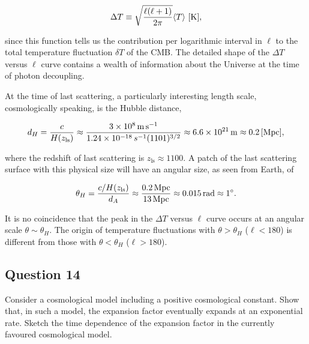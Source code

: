 \documentclass[a4paper,11pt]{article}
\begin{document}
\begin{align*}
    \Delta T \equiv \sqrt{\frac{\ell(\ell+1)}{2\pi}}\langle T \rangle ~ [{\rm K}],
\end{align*}

{\noindent}since this function tells us the contribution per logarithmic interval in $\ell$ to the total temperature fluctuation $\delta T$ of the CMB. The detailed shape of the $\Delta T$ versus $\ell$ curve contains a wealth of information about the Universe at the time of photon decoupling. 

{\noindent}At the time of last scattering, a particularly interesting length scale, cosmologically speaking, is the Hubble distance,

\begin{align*}
    d_H = \frac{c}{H(z_\mathrm{ls})} \approx \frac{3\times10^8\,{\rm m\,s^{-1}}}{1.24\times10^{-18}\,s^{-1}(1101)^{3/2}} \approx 6.6\times10^{21}\,{\rm m} \approx 0.2\,{[\rm Mpc]},
\end{align*}

{\noindent}where the redshift of last scattering is $z_\mathrm{ls}\approx1100$. A patch of the last scattering surface with this physical size will have an angular size, as seen from Earth, of

\begin{align*}
    \theta_H = \frac{c/H(z_\mathrm{ls})}{d_A} \approx \frac{0.2\,{\rm Mpc}}{13\,{\rm Mpc}} \approx 0.015\,{\rm rad} \approx 1^\circ.
\end{align*}

{\noindent}It is no coincidence that the peak in the $\Delta T$ versus $\ell$ curve occurs at an angular scale $θ\sim\theta_H$. The origin of temperature fluctuations with $\theta>\theta_H$ ($\ell<180$) is different from those with $\theta<\theta_H$ ($\ell>180$).


%
%

\newpage
\subsection{Question 14}

Consider a cosmological model including a positive cosmological constant. Show that, in such a model, the expansion factor eventually expands at an exponential rate. Sketch the time dependence of the expansion factor in the currently favoured cosmological model.
\end{document}
